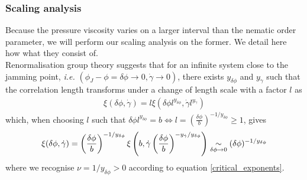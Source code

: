 \documentclass[class=article, float=false, crop=false]{standalone}
\begin{document}
\subsubsection{Scaling analysis}

Because the pressure viscosity varies on a larger interval than the nematic order parameter, we will perform our scaling analysis on the former. We detail here how what they consist of.\\


Renormalisation group theory suggests that for an infinite system close to the jamming point, \textit{i.e.} $(\phi_J-\phi=\delta\phi\rightarrow0,\dot{\gamma}\rightarrow0)$, there exists $y_{\delta\phi}$ and $y_{\dot{\gamma}}$ such that the correlation length transforms under a change of length scale with a factor $l$ as
\begin{align*}
\xi(\delta\phi,\dot{\gamma}) = l\xi(\delta\phi l^{y_{\delta\phi}},\dot{\gamma}l^{y_{\dot{\gamma}}})
\end{align*}
which, when choosing $l$ such that $\delta\phi l^{y_{\delta\phi}}=b \Leftrightarrow l=\left(\frac{\delta\phi}{b}\right)^{-1/y_{\delta\phi}} \ge 1$, gives
\begin{align*}
\xi(\delta\phi,\dot{\gamma}) = \left(\frac{\delta\phi}{b}\right)^{-1/y_{\delta\phi}} \xi\left(b,\dot{\gamma}\left(\frac{\delta\phi}{b}\right)^{-y_{\dot{\gamma}}/y_{\delta\phi}}\right) \underset{\delta\phi\rightarrow0}{\sim} (\delta\phi)^{-1/y_{\delta\phi}}
\end{align*}
where we recognise $\nu=1/y_{\delta\phi} > 0$ according to equation \ref{critical_exponents}.\\
\end{document}
